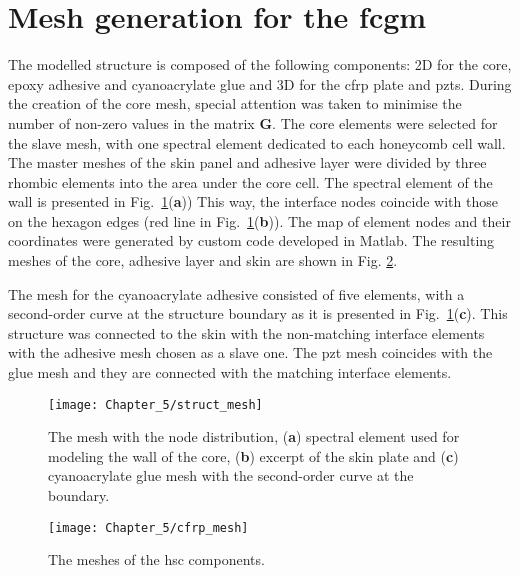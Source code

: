 \section{Mesh generation for the \acs{fcgm}}
\label{sec:honeycomb}

The modelled structure is composed of the following components: 2D for the core, epoxy adhesive and cyanoacrylate glue and 3D for the \ac{cfrp} plate and \acp{pzt}.
During the creation of the core mesh, special attention was taken to minimise the number of non-zero values in the matrix \(\textbf{G}\).
The core elements were selected for the slave mesh, with one spectral element dedicated to each honeycomb cell wall.
The master meshes of the skin panel and adhesive layer were divided by three rhombic elements into the area under the core cell.
The spectral element of the wall is presented in Fig.~\ref{fig:struct_mesh}(\textbf{a}))
This way, the interface nodes coincide with those on the hexagon edges (red line in Fig.~\ref{fig:struct_mesh}(\textbf{b})).
The map of element nodes and their coordinates were generated by custom code developed in Matlab.
The resulting meshes of the core, adhesive layer and skin are shown in Fig. \ref{fig:cas_mesh}.

The mesh for the cyanoacrylate adhesive consisted of five elements, with a second-order curve at the structure boundary as it is presented in Fig.~\ref{fig:struct_mesh}(\textbf{c}).
This structure was connected to the skin with the non-matching interface elements with the adhesive mesh chosen as a slave one.
The \ac{pzt} mesh coincides with the glue mesh and they are connected with the matching interface elements.
\begin{figure}[H]
	\begin{center}
		\texttt{[image: Chapter\_5/struct\_mesh]}
	\end{center}
	\caption{The mesh with the node distribution, (\textbf{a}) spectral element used for modeling the wall of the core, (\textbf{b}) excerpt of the skin plate and (\textbf{c}) cyanoacrylate glue mesh with the second-order curve at the boundary.}
	\label{fig:struct_mesh}
\end{figure}
\begin{figure}[H]
	\begin{center}
		\texttt{[image: Chapter\_5/cfrp\_mesh]}
	\end{center}
	\caption{The meshes of the \acf{hsc} components.}
	\label{fig:cas_mesh}
\end{figure}
